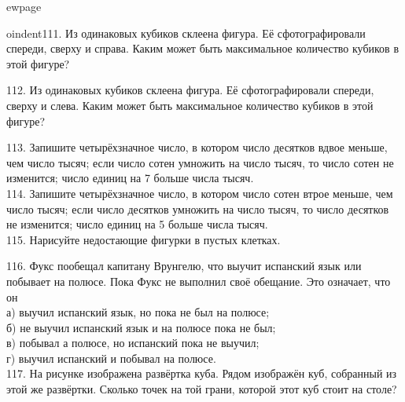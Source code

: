 ewpage

oindent111. Из одинаковых кубиков склеена фигура. Её сфотографировали спереди, сверху и справа. Каким может быть максимальное количество кубиков в этой фигуре?
\begin{center}
\begin{figure}[ht!]
\end{figure}
\end{center}
112. Из одинаковых кубиков склеена фигура. Её сфотографировали спереди, сверху и слева. Каким может быть максимальное количество кубиков в этой фигуре?
\begin{center}
\begin{figure}[ht!]
\end{figure}
\end{center}
113. Запишите четырёхзначное число, в котором число десятков вдвое меньше, чем число тысяч; если число сотен умножить на число тысяч, то число сотен не изменится; число единиц на 7 больше числа тысяч.\\
114. Запишите четырёхзначное число, в котором число сотен втрое меньше, чем число тысяч; если число десятков умножить на число тысяч, то число десятков не изменится; число единиц на 5 больше числа тысяч.\\
115. Нарисуйте недостающие фигурки в пустых клетках.
\begin{center}
\begin{figure}[ht!]
\end{figure}
\end{center}
116. Фукс пообещал капитану Врунгелю, что выучит испанский язык или побывает на полюсе. Пока Фукс не выполнил своё обещание. Это означает, что он\\
а) выучил испанский язык, но пока не был на полюсе;\\
б) не выучил испанский язык и на полюсе пока не был;\\
в) побывал а полюсе, но испанский пока не выучил;\\
г) выучил испанский и побывал на полюсе.\\
117. На рисунке изображена развёртка куба. Рядом изображён куб, собранный из этой же развёртки. Сколько точек на той грани, которой этот куб стоит на столе?
\begin{center}
\begin{figure}[ht!]
\end{figure}
\end{center}
